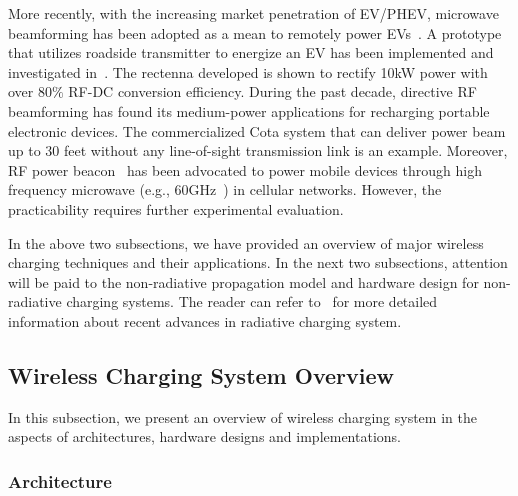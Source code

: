 \documentclass[twocolumn,10pt]{IEEEtran}
\begin{document}
More recently, with the increasing market penetration of EV/PHEV, microwave beamforming has been adopted as a mean to remotely power EVs~\cite{N.2011Shinohara,N2011Shinohara,N.2013Shinohara,Y.2012Kubo,N2013Shinohara}.
A prototype that utilizes roadside transmitter to energize an EV has been implemented and investigated in~\cite{N.2013Shinohara}. The rectenna developed is shown to rectify 10kW power with over 80$\%$ RF-DC conversion efficiency.
During the past decade, directive RF beamforming has found its medium-power applications for recharging portable electronic devices. The commercialized Cota system \cite{cota,cota_system} that can deliver power beam up to 30 feet without any line-of-sight transmission link is an example. Moreover, RF power beacon~\cite{K1207.5640Huang,Erol-Kantarci2014} has been advocated to power mobile devices through high frequency microwave (e.g., 60GHz~\cite{K.2015Huang}) in cellular networks. However, the practicability requires further experimental evaluation.  


 

In the above two subsections, we have provided an overview of major wireless charging techniques and their applications. In the next two subsections, attention will be paid to the non-radiative propagation model and hardware design for non-radiative charging systems. The reader can refer to~\cite{X.LuSurvey} for more detailed information about recent advances in radiative charging system.   
 




\subsection{Wireless Charging System Overview}

In this subsection, we present an overview of wireless charging system in the aspects of architectures, hardware designs and implementations. 

\subsubsection{Architecture}
\end{document}
